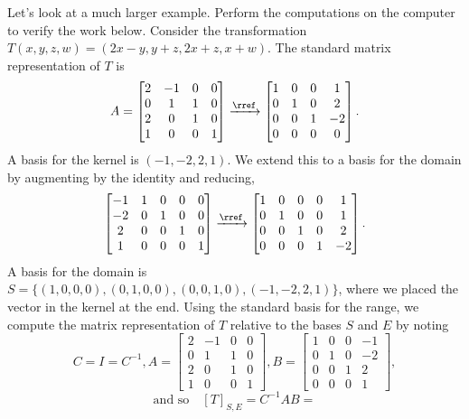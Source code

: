 \begin{example}
Let's look at a much larger example. 
Perform the computations on the computer to verify the work below. 
Consider the transformation $T(x,y,z,w)=(2x-y,y+z,2x+z,x+w)$.  
The standard matrix representation of $T$ is 
$$
A=
\begin{bmatrix}
 2 & -1 & 0 & 0 \\
 0 & 1 & 1 & 0 \\
 2 & 0 & 1 & 0 \\
 1 & 0 & 0 & 1
\end{bmatrix}
\xrightarrow{\rref}
\begin{bmatrix}
 1 & 0 & 0 & 1 \\
 0 & 1 & 0 & 2 \\
 0 & 0 & 1 & -2 \\
 0 & 0 & 0 & 0
\end{bmatrix}
.$$ 
A basis for the kernel is $(-1,-2,2,1)$. 
We extend this to a basis for the domain by augmenting by the identity and reducing, 
$$
\begin{bmatrix}
 -1 & 1 & 0 & 0 & 0 \\
 -2 & 0 & 1 & 0 & 0 \\
 2 & 0 & 0 & 1 & 0 \\
 1 & 0 & 0 & 0 & 1
\end{bmatrix}
\xrightarrow{\rref}
\begin{bmatrix}
 1 & 0 & 0 & 0 & 1 \\
 0 & 1 & 0 & 0 & 1 \\
 0 & 0 & 1 & 0 & 2 \\
 0 & 0 & 0 & 1 & -2
\end{bmatrix}.
$$
A basis for the domain is $S=\{(1,0,0,0),(0,1,0,0),(0,0,1,0),(-1,-2,2,1)\}$, where we placed the vector in the kernel at the end. 
Using the standard basis for the range, we compute the matrix representation of $T$ relative to the bases $S$ and $E$ by noting 
$$C=I=C^{-1},
A=
\begin{bmatrix}
 2 & -1 & 0 & 0 \\
 0 & 1 & 1 & 0 \\
 2 & 0 & 1 & 0 \\
 1 & 0 & 0 & 1
\end{bmatrix}, 
B=
\begin{bmatrix}
 1 & 0 & 0 & -1 \\
 0 & 1 & 0 & -2 \\
 0 & 0 & 1 & 2 \\
 0 & 0 & 0 & 1
\end{bmatrix},$$
$$\text{and so}\quad [T]_{S,E} = C^{-1}AB= 
$$
\end{example}

